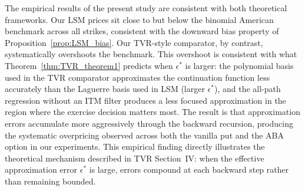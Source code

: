 The empirical results of the present study are consistent with both
theoretical frameworks. Our LSM prices sit close to but below the
binomial American benchmark across all strikes, consistent with the
downward bias property of Proposition~\ref{prop:LSM_bias}. Our TVR-style
comparator, by contrast, systematically overshoots the benchmark. This
overshoot is consistent with what Theorem~\ref{thm:TVR_theorem1} predicts
when $\epsilon^*$ is larger: the polynomial basis used in the TVR
comparator approximates the continuation function less accurately than the
Laguerre basis used in LSM (larger $\epsilon^*$), and the all-path
regression without an ITM filter produces a less focused approximation in
the region where the exercise decision matters most. The result is that
approximation errors accumulate more aggressively through the backward
recursion, producing the systematic overpricing observed across both the
vanilla put and the ABA option in our experiments. This empirical finding
directly illustrates the theoretical mechanism described in TVR
Section~IV: when the effective approximation error $\epsilon^*$ is large,
errors compound at each backward step rather than remaining bounded.
